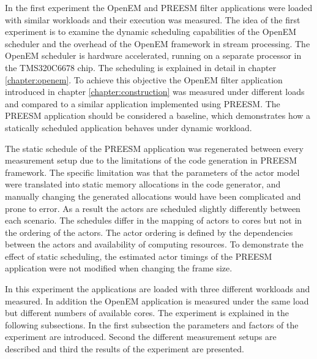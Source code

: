 In the first experiment the OpenEM and PREESM filter applications were loaded with similar workloads and their execution was measured. The idea of the first experiment is to examine the dynamic scheduling capabilities of the OpenEM scheduler and the overhead of the OpenEM framework in stream processing. The OpenEM scheduler is hardware accelerated, running on a separate processor in the TMS320C6678 chip. The scheduling is explained in detail in chapter \ref{chapter:openem}. To achieve this objective the OpenEM filter application introduced in chapter \ref{chapter:construction} was measured under different loads and compared to a similar application implemented using PREESM. The PREESM application should be considered a baseline, which demonstrates how a statically scheduled application behaves under dynamic workload.

The static schedule of the PREESM application was regenerated between every measurement setup due to the limitations of the code generation in PREESM framework. The specific limitation was that the parameters of the actor model were translated into static memory allocations in the code generator, and manually changing the generated allocations would have been complicated and prone to error. As a result the actors are scheduled slightly differently between each scenario. The schedules differ in the mapping of actors to cores but not in the ordering of the actors. The actor ordering is defined by the dependencies between the actors and availability of computing resources. To demonstrate the effect of static scheduling, the estimated actor timings of the PREESM application were not modified when changing the frame size. 

In this experiment the applications are loaded with three different workloads and measured. In addition the OpenEM application is measured under the same load but different numbers of available cores. The experiment is explained in the following subsections. In the first subsection the parameters and factors of the experiment are introduced. Second the different measurement setups are described and third the results of the experiment are presented.
